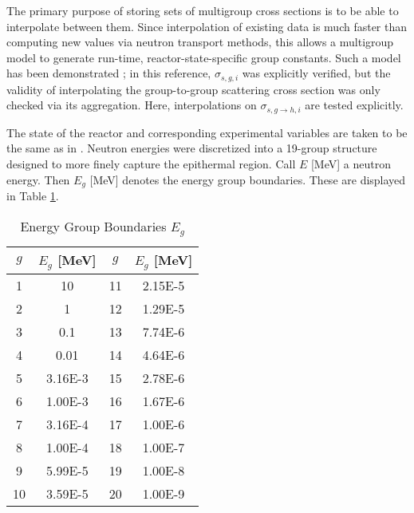 \documentclass{physor2012}
\begin{document}
The primary purpose of storing sets of multigroup cross sections is
to be able to interpolate between them.  Since interpolation of existing
data is much faster than computing new values via neutron
transport methods, this allows a multigroup model to generate
run-time, reactor-state-specific group constants.  Such a model has been
demonstrated \cite{ScopatzAnthony2011}; in this reference, $\sigma_{s,g,i}$ was explicitly
verified, but the validity of interpolating the group-to-group scattering
cross section was only checked via its aggregation.  Here, interpolations on
$\sigma_{s,g\to h,i}$ are tested explicitly.

The state of the reactor and corresponding experimental variables are taken
to be the same as in \cite{ScopatzAnthony2011}.  Neutron energies were discretized 
into a 19-group structure designed to more finely capture the epithermal region.  
Call $E$ [MeV] a neutron energy. Then $E_g$ [MeV] denotes the energy group boundaries.
These are displayed in Table \ref{group_boundaries}.
\begin{table}[htbp]
\begin{center}
\caption{Energy Group Boundaries $E_g$}
\label{group_boundaries}
\begin{tabular}{|c|c||c|c|}
\hline
\textbf{$g$} & \textbf{$E_g$ [MeV]} & \textbf{$g$} & \textbf{$E_g$ [MeV]} \\
\hline
1  & 10      & 11 & 2.15E-5 \\
2  & 1       & 12 & 1.29E-5 \\
3  & 0.1     & 13 & 7.74E-6 \\
4  & 0.01    & 14 & 4.64E-6 \\
5  & 3.16E-3 & 15 & 2.78E-6 \\
6  & 1.00E-3 & 16 & 1.67E-6 \\
7  & 3.16E-4 & 17 & 1.00E-6 \\
8  & 1.00E-4 & 18 & 1.00E-7 \\
9  & 5.99E-5 & 19 & 1.00E-8 \\
10 & 3.59E-5 & 20 & 1.00E-9 \\
\hline
\end{tabular}
\end{center}
\end{table}
\end{document}

